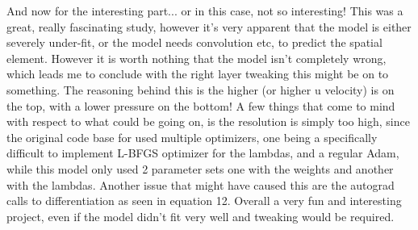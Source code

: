 \documentclass{article}
\begin{document}
And now for the interesting part... or in this case, not so
interesting! This was a great, really fascinating study, however it's very
apparent that the model is either severely under-fit,
or the model needs convolution etc, to predict the spatial element.
However it is worth nothing that the model isn't completely wrong, which leads
me to conclude with the right layer tweaking this might be on to something. The
reasoning behind this is the higher (or higher u velocity) is on the top, with
a lower pressure on the bottom! A few things that come to mind with respect to
what could be going on, is the resolution is simply too high, since the
original code base for \citeauthor{DBLP:journals/corr/abs-1711-10566} used
multiple optimizers, one being a specifically difficult to implement L-BFGS
optimizer for the lambdas, and a regular Adam, while this model only used 2
parameter sets one with the weights and another with the lambdas. Another issue
that might have caused this are the autograd calls to differentiation as seen
in equation 12. Overall a very fun and interesting project, even if the model
didn't fit very well and tweaking would be required.
\end{document}
